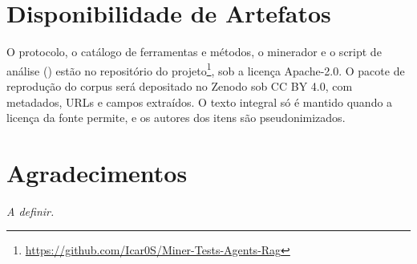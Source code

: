 \documentclass[sigconf]{acmart}
\begin{document}
\section*{Disponibilidade de Artefatos}

O protocolo, o catálogo de ferramentas e métodos, o minerador e o script de análise () estão no repositório do projeto\footnote{\url{https://github.com/Icar0S/Miner-Tests-Agents-Rag}}, sob a licença Apache-2.0. O pacote de reprodução do corpus será depositado no Zenodo sob CC BY 4.0, com metadados, URLs e campos extraídos. O texto integral só é mantido quando a licença da fonte permite, e os autores dos itens são pseudonimizados. %

\section*{Agradecimentos}
\textit{A definir.}



\end{document}
